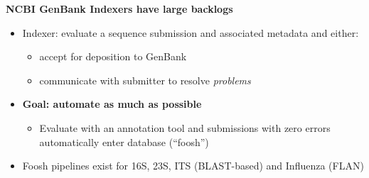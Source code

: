 \documentclass[landscape]{slides}
\begin{document}
\begin{slide}
\begin{center}
\textbf{NCBI GenBank Indexers have large backlogs}

\begin{itemize}
\item Indexer: evaluate a sequence submission and associated metadata
  and either:
  \begin{itemize} 
    \item accept for deposition to GenBank
    \item communicate with submitter to resolve \emph{problems}
  \end{itemize}

\item \textbf{Goal: automate as much as possible}
  \begin{itemize}
  \item Evaluate with an annotation tool and submissions with zero
    errors automatically enter database
    (``foosh'')
  \end{itemize}
  \item Foosh pipelines exist for 16S, 23S, ITS (BLAST-based) and
    Influenza (FLAN)
\end{itemize}

\vfill
\end{center}
\end{slide}
\end{document}
